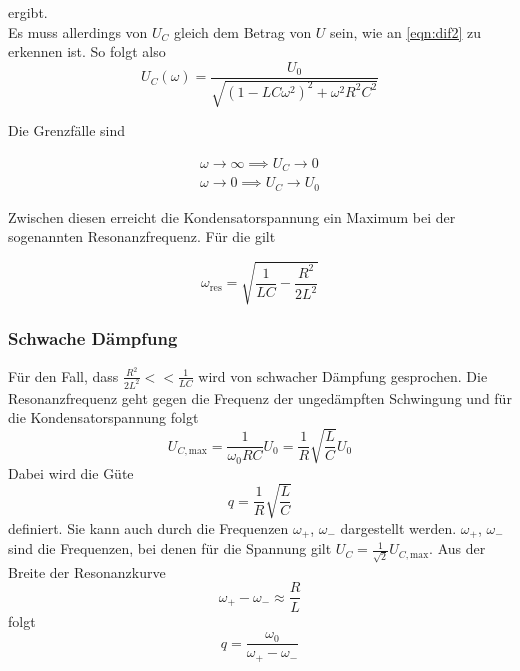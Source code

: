    ergibt.\\
    Es muss allerdings von $U_C$ gleich dem Betrag von $U$ sein, wie an \eqref{eqn:dif2}
    zu erkennen ist. So folgt also
    \begin{equation}
        U_C(\omega) = \frac{U_0}{\sqrt{\left(1-LC\omega^2\right)^2 + \omega^2 R^2 C^2}}
        \label{solution}
    \end{equation}

    \noindent Die Grenzfälle sind

    \begin{align*}
        \omega \to \infty \implies U_C \to 0 \\
        \omega \to 0 \implies U_C \to U_0
    \end{align*}

    \noindent Zwischen diesen erreicht die Kondensatorspannung ein Maximum
    bei der sogenannten Resonanzfrequenz. Für die gilt

    \begin{equation}
        \omega_{\text{res}} = \sqrt{\frac{1}{LC} - \frac{R^2}{2L^2}}
        \label{eqn:resonance}
    \end{equation}
    
    \subsubsection{Schwache Dämpfung}
        Für den Fall, dass $\frac{R^2}{2L^2} << \frac{1}{LC}$ wird von schwacher 
        Dämpfung gesprochen. Die Resonanzfrequenz geht gegen die Frequenz 
        der ungedämpften Schwingung und für die Kondensatorspannung folgt
        \begin{equation*}
            U_{C, \text{max}} = \frac{1}{\omega_0 RC} U_0 = \frac{1}{R} \sqrt{\frac{L}{C}} U_0
        \end{equation*}
        \noindent Dabei wird die Güte 
        \begin{equation}
            q = \frac{1}{R} \sqrt{\frac{L}{C}}
            \label{eqn:gute}
        \end{equation}
        definiert. Sie kann auch durch die Frequenzen $\omega_+$, $\omega_-$
        dargestellt werden. $\omega_+$, $\omega_-$ sind die Frequenzen, bei 
        denen für die Spannung gilt $U_C = \frac{1}{\sqrt{2}}U_{C, \text{max}}$.
        Aus der Breite der Resonanzkurve
        \begin{equation}
            \omega_+ - \omega_- \approx \frac{R}{L}
        \end{equation}
        folgt
        \begin{equation*}
            q = \frac{\omega_0}{\omega_+ - \omega_-}
        \end{equation*}


